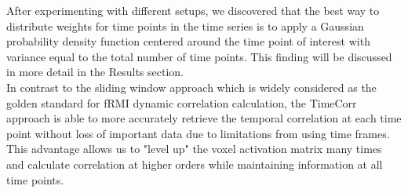 \documentclass[12pt]{article}
\begin{document}
After experimenting with different setups, we discovered that the best way to distribute weights for time points in the time series is to apply a Gaussian probability density function centered around the time point of interest with variance equal to the total number of time points. This finding will be discussed in more detail in the Results section.\\

In contrast to the sliding window approach which is widely considered as the golden standard for fRMI dynamic correlation calculation, the TimeCorr approach is able to more accurately retrieve the temporal correlation at each time point without loss of important data due to limitations from using time frames. This advantage allows us to "level up" the voxel activation matrix many times and calculate correlation at higher orders while maintaining information at all time points.\\
\end{document}
